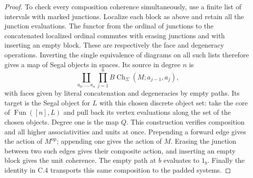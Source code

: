 \begin{proof}
To check every composition coherence simultaneously, use a finite
list of intervals with marked junctions. Localize each block as
above and retain all the junction evaluations. The functor from
the ordinal of junctions to the concatenated localized ordinal
commutes with erasing junctions and with inserting an empty block.
These are respectively the face and degeneracy operations.
Inverting the single equivalence of diagrams on all such lists
therefore gives a map of Segal objects in spaces. Its source in
degree $n$ is
\[
 \coprod_{a_0,\ldots,a_n}\prod_{j=1}^{n}
 B\operatorname{Ch}_\Sigma(M;a_{j-1},a_j),
\]
with faces given by literal concatenation and degeneracies by empty
paths. Its target is the Segal object for $L$ with this chosen
discrete object set: take the core of $\operatorname{Fun}([n],L)$
and pull back its vertex evaluations along the set of the chosen
objects. Degree one is the map $Q$. This construction verifies
composition and all higher associativities and units at once.
Prepending a forward edge gives the action of $M^{\mathrm{op}}$;
appending one gives the action of $M$. Erasing the junction between
two such edges gives their composite action, and inserting an
empty block gives the unit coherence. The empty path at $b$
evaluates to $1_b$. Finally the identity in C.4 transports this
same composition to the padded systems.
\end{proof}

